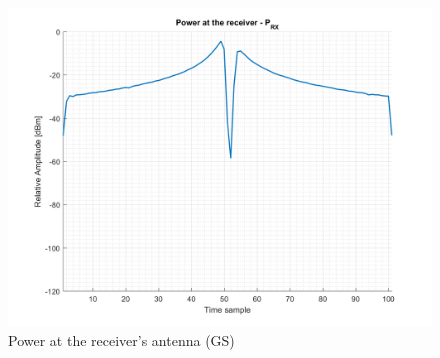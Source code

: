 \begin{figure}[H]
	\centering
	\includegraphics[scale=0.8]{figures/s3_power.png}
	\caption{Power at the receiver's antenna (GS)}
	\label{fig:s3_power}
\end{figure}